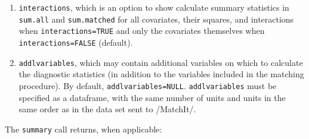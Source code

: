 \documentclass[oneside,letterpaper,titlepage]{article}
\begin{document}
\begin{enumerate}
\item \texttt{interactions}, which is an option to show calculate summary
  statistics in \texttt{sum.all} and \texttt{sum.matched} for all
  covariates, their squares, and interactions when
  \texttt{interactions=TRUE} and only the covariates themselves when
  \texttt{interactions=FALSE} (default).
\item \texttt{addlvariables}, which may contain additional variables on which
  to calculate the diagnostic statistics (in addition to the variables included in
  the matching procedure).  By default, \texttt{addlvariables=NULL}.  \texttt{addlvariables}
  must be specified as a dataframe, with the same number of units and units in the same order as in the data set sent to
  /MatchIt/.  
\end{enumerate}

The \texttt{summary} call returns, when applicable:
\end{document}
